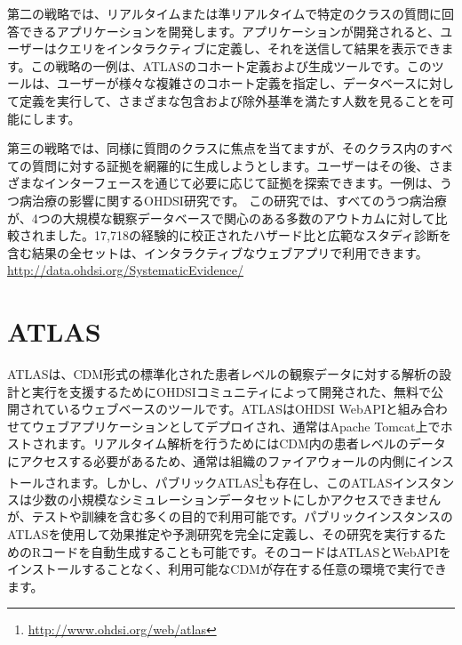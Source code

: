 \documentclass[
  11pt]{book}
\theoremstyle{definition}
\theoremstyle{definition}
\theoremstyle{definition}
\theoremstyle{definition}
\theoremstyle{remark}
\begin{document}
第二の戦略では、リアルタイムまたは準リアルタイムで特定のクラスの質問に回答できるアプリケーションを開発します。アプリケーションが開発されると、ユーザーはクエリをインタラクティブに定義し、それを送信して結果を表示できます。この戦略の一例は、ATLASのコホート定義および生成ツールです。このツールは、ユーザーが様々な複雑さのコホート定義を指定し、データベースに対して定義を実行して、さまざまな包含および除外基準を満たす人数を見ることを可能にします。

第三の戦略では、同様に質問のクラスに焦点を当てますが、そのクラス内のすべての質問に対する証拠を網羅的に生成しようとします。ユーザーはその後、さまざまなインターフェースを通じて必要に応じて証拠を探索できます。一例は、うつ病治療の影響に関するOHDSI研究です。 \citep[ ]{schuemie_2018b} この研究では、すべてのうつ病治療が、4つの大規模な観察データベースで関心のある多数のアウトカムに対して比較されました。17,718の経験的に校正されたハザード比と広範なスタディ診断を含む結果の全セットは、インタラクティブなウェブアプリで利用できます。\url{http://data.ohdsi.org/SystematicEvidence/}\\

\section{ATLAS}\label{atlas}

ATLASは、CDM形式の標準化された患者レベルの観察データに対する解析の設計と実行を支援するためにOHDSIコミュニティによって開発された、無料で公開されているウェブベースのツールです。ATLASはOHDSI WebAPIと組み合わせてウェブアプリケーションとしてデプロイされ、通常はApache Tomcat上でホストされます。リアルタイム解析を行うためにはCDM内の患者レベルのデータにアクセスする必要があるため、通常は組織のファイアウォールの内側にインストールされます。しかし、パブリックATLAS\footnote{\url{http://www.ohdsi.org/web/atlas}}も存在し、このATLASインスタンスは少数の小規模なシミュレーションデータセットにしかアクセスできませんが、テストや訓練を含む多くの目的で利用可能です。パブリックインスタンスのATLASを使用して効果推定や予測研究を完全に定義し、その研究を実行するためのRコードを自動生成することも可能です。そのコードはATLASとWebAPIをインストールすることなく、利用可能なCDMが存在する任意の環境で実行できます。
\end{document}
